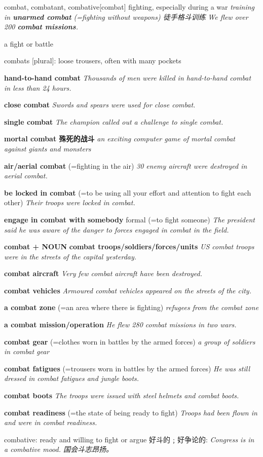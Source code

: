\begin{DefWord}{combat, combatant, combative}[combat]
    fighting, especially during a war
    \textit{training in \textbf{unarmed combat} (=fighting without weapons) 徒手格斗训练}
    \textit{We flew over 200 \textbf{combat missions}.}

    a fight or battle

    combats [plural]: loose trousers, often with many pockets

    \textbf{hand-to-hand combat}
    \textit{Thousands of men were killed in hand-to-hand combat in less than 24 hours.}

    \textbf{close combat}
    \textit{Swords and spears were used for close combat.}

    \textbf{single combat}
    \textit{The champion called out a challenge to single combat.}

    \textbf{mortal combat 殊死的战斗}
    \textit{an exciting computer game of mortal combat against giants and monsters}

    \textbf{air/aerial combat}
    (=fighting in the air)
\textit{30 enemy aircraft were destroyed in aerial combat.}

\textbf{be locked in combat}
(=to be using all your effort and attention to fight each other)
\textit{Their troops were locked in combat.}

\textbf{engage in combat with somebody}
formal (=to fight someone)
\textit{The president said he was aware of the danger to forces engaged in combat in the field.}

\textbf{combat + NOUN}
\textbf{combat troops/soldiers/forces/units}
\textit{US combat troops were in the streets of the capital yesterday.}

\textbf{combat aircraft}
\textit{Very few combat aircraft have been destroyed.}

\textbf{combat vehicles}
\textit{Armoured combat vehicles appeared on the streets of the city.}

\textbf{a combat zone}
(=an area where there is fighting)
\textit{refugees from the combat zone}

\textbf{a combat mission/operation}
\textit{He flew 280 combat missions in two wars.}

\textbf{combat gear}
(=clothes worn in battles by the armed forces)
\textit{a group of soldiers in combat gear}

\textbf{combat fatigues}
(=trousers worn in battles by the armed forces)
\textit{He was still dressed in combat fatigues and jungle boots.}

\textbf{combat boots}
\textit{The troops were issued with steel helmets and combat boots.}

\textbf{combat readiness}
(=the state of being ready to fight)
\textit{Troops had been flown in and were in combat readiness.}

combative: ready and willing to fight or argue 好斗的﹔好争论的:
\textit{ Congress is in a combative mood. 国会斗志昂扬。}

\end{DefWord}

